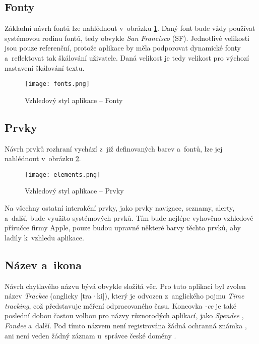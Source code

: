 \subsection{Fonty}

Základní návrh fontů lze nahlédnout v~obrázku \ref{fig:fonts}. Daný font bude vždy používat systémovou rodinu fontů, tedy obvykle \emph{San Francisco} (SF). Jednotlivé velikosti jsou pouze referenční, protože aplikace by měla podporovat dynamické fonty a~reflektovat tak škálování uživatele. Daná velikost je tedy velikost pro výchozí nastavení škálování textu.

\begin{figure}[h]
	\centering
	\texttt{[image: fonts.png]}
	\caption{Vzhledový styl aplikace – Fonty}
	\label{fig:fonts}
\end{figure}

\subsection{Prvky}

Návrh prvků rozhraní vychází z~již definovaných barev a~fontů, lze jej nahlédnout v~obrázku \ref{fig:elements}.

\begin{figure}[h]
	\centering
	\texttt{[image: elements.png]}
	\caption{Vzhledový styl aplikace – Prvky}
	\label{fig:elements}
\end{figure}

Na všechny ostatní interakční prvky, jako prvky navigace, seznamy, alerty, a~další, bude využito systémových prvků. Tím bude nejlépe vyhověno vzhledové příručce firmy Apple, pouze budou upravné některé barvy těchto prvků, aby ladily k~vzhledu aplikace.

\subsection{Název a~ikona}

Návrh chytlavého názvu bývá obvykle složitá věc. Pro tuto aplikaci byl zvolen název \emph{Trackee} (anglicky [tra·ki]), který je odvozen z~anglického pojmu \emph{Time tracking}, což představuje měření odpracovaného času. Koncovka \emph{-ee} je také poslední dobou častou volbou pro názvy různorodých aplikací, jako \emph{Spendee} \cite{spendee}, \emph{Fondee} \cite{fondee} a~další. Pod tímto názvem není registrována žádná ochranná známka \cite{upd-database}, ani není veden žádný záznam u~správce české domény \cite{cz-nic-trackee}.

